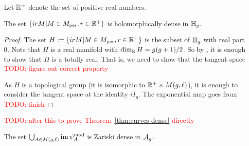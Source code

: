 \documentclass{amsart}
\begin{document}
Let $\mathbb{R}^+$ denote the set of positive real numbers.
\begin{lemma}\label{lemma:holomorphic-closure-irM}
  The set ${\{ irM | M \in M_{\textrm{per}}, r \in \mathbb{R}^+\}}$ is holomorphically dense in $\mathbb{H}_g$.
\end{lemma}


\begin{proof}
  The set $H := \{ irM | M \in M_{\textrm{per}}, r \in \mathbb{R}^+\}$ is the subset of $\mathbb{H}_g$ with real part $0$. Note that $H$ is a real manifold with $\dim_{\mathbb{R}} H = g(g+1)/2$. So by \cite[Ch.~4.8]{krantz2017harmonic}, it is enough to show that $H$ is a totally real. That is, we need to show that the tangent space \textcolor{red}{TODO: figure out correct property}

  As $H$ is a topological group (it is isomorphic to $\mathbb{R}^+ \times M(g,\ell)$), it is enough to consider the tangent space at the identity $iI_g$. The exponential map goes from \textcolor{red}{TODO: finish}
\end{proof}





\textcolor{red}{TODO: alter this to prove Theorem~\ref{thm:curves-dense} directly}
\begin{theorem}
  The set
  ${\bigcup_{A \in M(g,\ell)} \operatorname{im} \psi_{A}^\mathrm{mod}}$
  is Zariski dense in $\mathcal{A}_g$.
\end{theorem}
\end{document}
